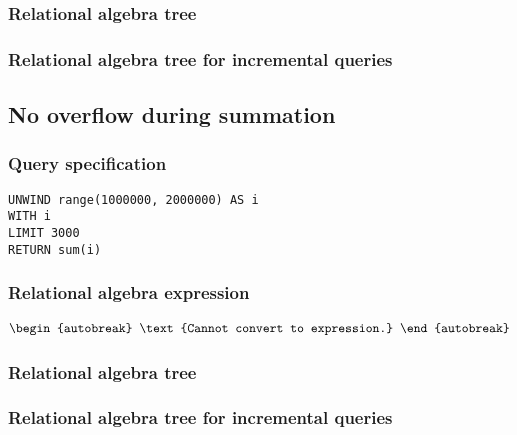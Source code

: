 \subsubsection*{Relational algebra tree}


\subsubsection*{Relational algebra tree for incremental queries}


\subsection{No overflow during summation}

\subsubsection*{Query specification}

\begin{lstlisting}
UNWIND range(1000000, 2000000) AS i
WITH i
LIMIT 3000
RETURN sum(i)
\end{lstlisting}

\subsubsection*{Relational algebra expression}

\begin{align*}
\begin{autobreak}
\text{Cannot convert to expression.}
\end{autobreak}
\end{align*}

\subsubsection*{Relational algebra tree}


\subsubsection*{Relational algebra tree for incremental queries}


